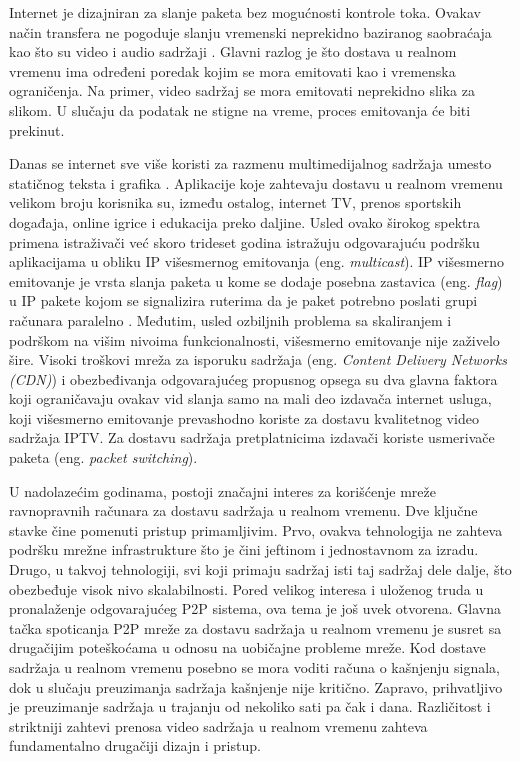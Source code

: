 \documentclass[12pt,oneside]{memoir}
\begin{document}
Internet je dizajniran za slanje paketa bez mogućnosti kontrole toka. Ovakav način transfera ne pogoduje slanju vremenski neprekidno baziranog saobraćaja kao što su video i audio sadržaji \cite{Tanenbaum}. Glavni razlog je što dostava u realnom vremenu ima određeni poredak kojim se mora emitovati kao i vremenska ograničenja. Na primer, video sadržaj se mora emitovati neprekidno slika za slikom. U slučaju da podatak ne stigne na vreme, proces emitovanja će biti prekinut.

Danas se internet sve više koristi za razmenu multimedijalnog sadržaja umesto statičnog teksta i grafika \cite{Beggs:1999}. Aplikacije koje zahtevaju dostavu u realnom vremenu velikom broju korisnika su, između ostalog, internet TV, prenos sportskih događaja, online igrice i edukacija preko daljine. Usled ovako širokog spektra primena istraživači već skoro trideset godina istražuju odgovarajuću podršku aplikacijama u obliku IP višesmernog emitovanja (eng. \textit{multicast}). IP višesmerno emitovanje je vrsta slanja paketa u kome se dodaje posebna zastavica (eng. \textit{flag}) u IP pakete kojom se signalizira ruterima da je paket potrebno poslati grupi računara paralelno \cite{Deering:1990}. Međutim, usled ozbiljnih problema sa skaliranjem i podrškom na višim nivoima funkcionalnosti, višesmerno emitovanje nije zaživelo šire. Visoki troškovi mreža za isporuku sadržaja (eng. \textit{Content Delivery Networks (CDN)}) i obezbeđivanja odgovarajućeg propusnog opsega su dva glavna faktora koji ograničavaju ovakav vid slanja samo na mali deo izdavača internet usluga, koji višesmerno emitovanje prevashodno koriste za dostavu kvalitetnog video sadržaja IPTV. Za dostavu sadržaja pretplatnicima izdavači koriste usmerivače paketa (eng. \textit{packet switching}). 

U nadolazećim godinama, postoji značajni interes za korišćenje mreže ravnopravnih računara za dostavu sadržaja u realnom vremenu. Dve ključne stavke čine pomenuti pristup primamljivim. Prvo, ovakva tehnologija ne zahteva podršku mrežne infrastrukture što je čini jeftinom i jednostavnom za izradu. Drugo, u takvoj tehnologiji, svi koji primaju sadržaj isti taj sadržaj dele dalje, što obezbeđuje visok nivo skalabilnosti. Pored velikog interesa i uloženog truda u pronalaženje odgovarajućeg P2P sistema, ova tema je još uvek otvorena. 
Glavna tačka spoticanja P2P mreže za dostavu sadržaja u realnom vremenu je susret sa drugačijim poteškoćama u odnosu na uobičajne probleme mreže. Kod dostave sadržaja u realnom vremenu posebno se mora voditi računa o kašnjenju signala, dok u slučaju preuzimanja sadržaja kašnjenje nije kritično. Zapravo, prihvatljivo je preuzimanje sadržaja u trajanju od nekoliko sati pa čak i dana. Različitost i striktniji zahtevi prenosa video sadržaja u realnom vremenu zahteva fundamentalno drugačiji dizajn i pristup.
\end{document}
